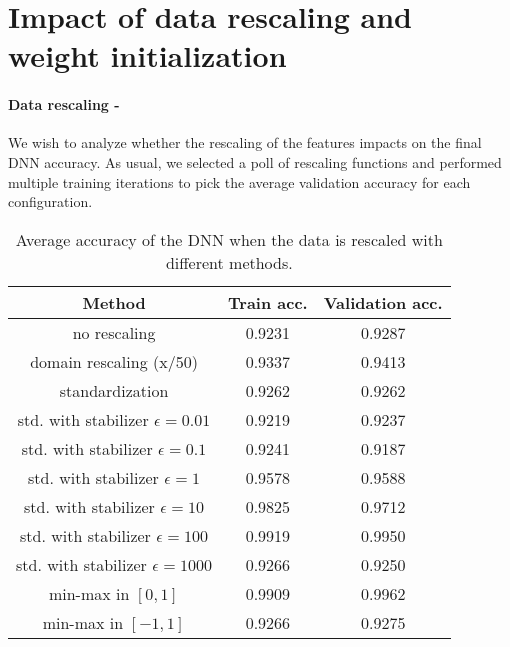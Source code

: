 \section{Impact of data rescaling and weight initialization}
\label{sec:data_init}


\paragraph{\textbf{Data rescaling - }}  %

We wish to analyze whether the rescaling of the features impacts on the final DNN accuracy. As usual, we selected a poll of rescaling functions \cite{web:feature_scaling} and performed multiple training iterations to pick the average validation accuracy for each configuration.

\begin{table}[h]
\begin{tabular}{ccc}
\hline
Method                        & Train acc. & Validation acc. \\ \hline
no rescaling                  & 0.9231         & 0.9287              \\
domain rescaling (x/50)       & 0.9337         & 0.9413              \\
standardization               & 0.9262         & 0.9262              \\
std. with stabilizer $\epsilon = 0.01$ & 0.9219         & 0.9237              \\
std. with stabilizer $\epsilon = 0.1$  & 0.9241         & 0.9187              \\
std. with stabilizer $\epsilon = 1$    & 0.9578         & 0.9588              \\
std. with stabilizer $\epsilon = 10$   & 0.9825         & 0.9712              \\
std. with stabilizer $\epsilon = 100$  & 0.9919         & 0.9950              \\
std. with stabilizer $\epsilon = 1000$ & 0.9266         & 0.9250              \\
min-max in $[0,1]$            & 0.9909         & 0.9962              \\
min-max in $[-1,1]$           & 0.9266         & 0.9275              \\ \hline
\end{tabular}
\caption{\label{tab:rescaling_results}Average accuracy of the DNN when the data is rescaled with different methods.}
\end{table}

